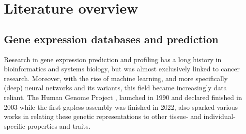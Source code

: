 \documentclass[]{article}
\renewcommand{\cite}{\citep}
\begin{document}
%
%
%
%
%
%	

\newpage
\section{Literature overview}
\label{sec:relatedwork}
\subsection{Gene expression databases and prediction}
\label{sec:relatedwork_geneexp}
Research in gene expression prediction and profiling has a long history in bioinformatics and systems biology, but was almost exclusively linked to cancer research. Moreover, with the rise of machine learning, and more specifically (deep) neural networks and its variants, this field became increasingly data reliant. The Human Genome Project \cite{watson1990human}, launched in 1990 and declared finished in 2003 while the first gapless assembly was finished in 2022, also sparked various works in relating these genetic representations to other tissue- and individual-specific properties and traits.\\ 
\end{document}
